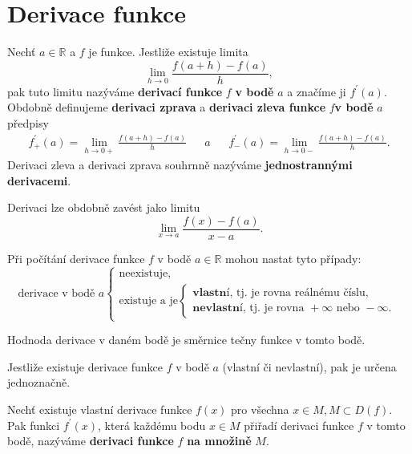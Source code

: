 \section{Derivace funkce}
\begin{definition}
Nechť $a \in \mathbb R$ a $f$ je funkce. Jestliže existuje limita
$$\lim_{h\to 0} \frac{f(a+h)-f(a)}{h},$$
pak tuto limitu nazýváme \textbf{derivací funkce} $f$ \textbf{v bodě} $a$ a značíme ji $f^\prime (a).$
Obdobně definujeme \textbf{derivaci zprava} a \textbf{derivaci zleva funkce} $f$\textbf{v bodě}
$a$ předpisy
\begin{align*}
    f_+^\prime(a) = \lim_{h\to 0+} \frac{f(a+h)-f(a)}{h} & & a & & f_-^\prime(a) = \lim_{h\to 0-} \frac{f(a+h)-f(a)}{h}.
\end{align*}
Derivaci zleva a derivaci zprava souhrnně nazýváme \textbf{jednostrannými derivacemi}.
\end{definition}

\begin{pozn}
    Derivaci lze obdobně zavést jako limitu
    $$\lim_{x\to a} \frac{f(x)-f(a)}{x-a}.$$
\end{pozn}

\begin{pozn}
     Při počítání derivace funkce $f$ v bodě $a\in \mathbb R$ mohou nastat
     tyto případy:
     $$
     \textrm{derivace v bodě } a \begin{cases}
        \textrm{neexistuje,} \\
        \textrm{existuje a je} \begin{cases}
            \textbf{vlastní}\textrm{, tj. je rovna reálnému číslu}, \\
            \textbf{nevlastní}\textrm{, tj. je rovna } +\infty \textrm{ nebo } - \infty.
        \end{cases}
     \end{cases}
     $$
\end{pozn}

\begin{pozn}
    Hodnoda derivace v daném bodě je směrnice tečny funkce v tomto bodě.
\end{pozn}

\begin{veta}
    Jestliže existuje derivace funkce $f$ v bodě $a$ (vlastní či nevlastní),
    pak je určena jednoznačně.
\end{veta}

\begin{definition}
Nechť existuje vlastní derivace funkce $f(x)$ pro všechna $x\in M, M\subset D(f).$
Pak funkci $f^\prime(x)$, která každému bodu $x\in M$ přiřadí derivaci funkce $f$
v tomto bodě, nazýváme \textbf{derivaci funkce} $f$ \textbf{na množině} $M.$
\end{definition}

